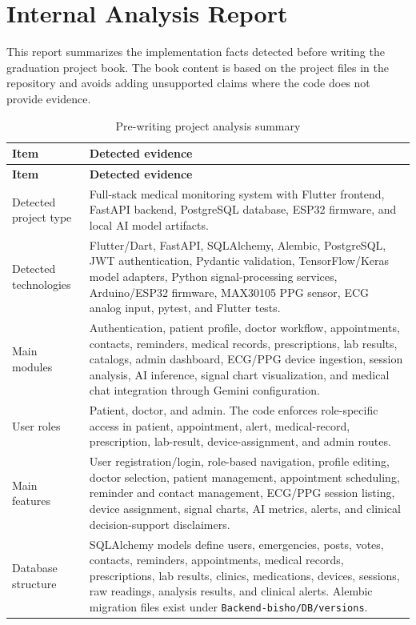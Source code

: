 \chapter*{Internal Analysis Report}

This report summarizes the implementation facts detected before writing the graduation project book. The book content is based on the project files in the repository and avoids adding unsupported claims where the code does not provide evidence.

\begin{longtable}{p{} p{}}
\caption{Pre-writing project analysis summary}\\
\toprule
\textbf{Item} & \textbf{Detected evidence}\\
\midrule
\endfirsthead
\toprule
\textbf{Item} & \textbf{Detected evidence}\\
\midrule
\endhead
Detected project type & Full-stack medical monitoring system with Flutter frontend, FastAPI backend, PostgreSQL database, ESP32 firmware, and local AI model artifacts.\\
Detected technologies & Flutter/Dart, FastAPI, SQLAlchemy, Alembic, PostgreSQL, JWT authentication, Pydantic validation, TensorFlow/Keras model adapters, Python signal-processing services, Arduino/ESP32 firmware, MAX30105 PPG sensor, ECG analog input, pytest, and Flutter tests.\\
Main modules & Authentication, patient profile, doctor workflow, appointments, contacts, reminders, medical records, prescriptions, lab results, catalogs, admin dashboard, ECG/PPG device ingestion, session analysis, AI inference, signal chart visualization, and medical chat integration through Gemini configuration.\\
User roles & Patient, doctor, and admin. The code enforces role-specific access in patient, appointment, alert, medical-record, prescription, lab-result, device-assignment, and admin routes.\\
Main features & User registration/login, role-based navigation, profile editing, doctor selection, patient management, appointment scheduling, reminder and contact management, ECG/PPG session listing, device assignment, signal charts, AI metrics, alerts, and clinical decision-support disclaimers.\\
Database structure & SQLAlchemy models define users, emergencies, posts, votes, contacts, reminders, appointments, medical records, prescriptions, lab results, clinics, medications, devices, sessions, raw readings, analysis results, and clinical alerts. Alembic migration files exist under \texttt{Backend-bisho/DB/versions}.\\

\end{longtable}
